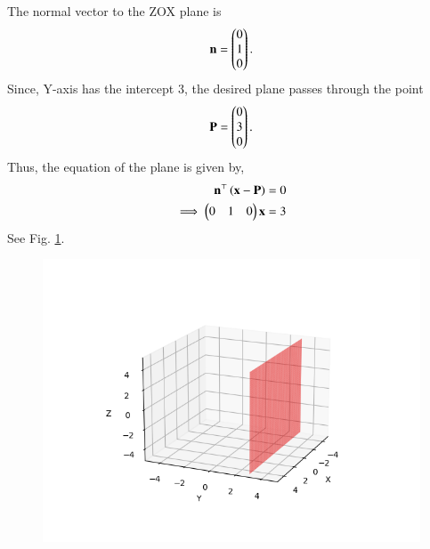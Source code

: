 The normal vector to the ZOX plane is
\begin{align} 
\mathbf{n} = \begin{pmatrix}0\\1\\0\end{pmatrix}.
\end{align}
Since, Y-axis has the intercept 3, the desired plane passes through the point
\begin{align}
\mathbf{P}=\begin{pmatrix}0\\3\\0\end{pmatrix}.
\end{align}
Thus, the equation of the plane is given by,
\begin{align}
	\mathbf{n}^\top \left(\mathbf{x}-\mathbf{P}\right) &= 0\\
	\implies \begin{pmatrix}0&1&0\end{pmatrix} \mathbf{x}&= 3
\end{align}
See Fig. 
     \ref{fig:chapters/12/11/3/8/1}.
\begin{figure}[h!]
  \centering
   \includegraphics[width=\columnwidth]{chapters/12/11/3/8/figs/plane1.png}
    \caption{}
     \label{fig:chapters/12/11/3/8/1}
     \end{figure}  
